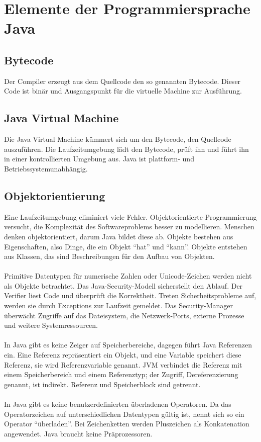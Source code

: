 \section{Elemente der Programmiersprache Java}
\subsection{Bytecode}
Der Compiler erzeugt aus dem Quellcode den so genannten Bytecode. Dieser Code ist binär und Ausgangspunkt für die virtuelle Machine zur Ausführung.
\subsection{Java Virtual Machine}
Die Java Virtual Machine kümmert sich um den Bytecode, den Quellcode auszuführen. Die Laufzeitumgebung lädt den Bytecode, prüft ihn und führt ihn in einer kontrollierten Umgebung aus. Java ist plattform- und Betriebssystemunabhängig.
\subsection{Objektorientierung}
Eine Laufzeitumgebung eliminiert viele Fehler. Objektorientierte Programmierung versucht, die Komplexität des Softwareproblems besser zu modellieren. Menschen denken objektorientiert, darum Java bildet diese ab. Objekte bestehen aus Eigenschaften, also Dinge, die ein Objekt ``hat'' und ``kann''. Objekte entstehen aus Klassen, das sind Beschreibungen für den Aufbau von Objekten.
\\\\
Primitive Datentypen für numerische Zahlen oder Unicode-Zeichen werden nicht als Objekte betrachtet. Das Java-Security-Modell sicherstellt den Ablauf. Der Verifier liest Code und überprüft die Korrektheit. Treten Sicherheitsprobleme auf, werden sie durch Exceptions zur Laufzeit gemeldet. Das Security-Manager überwächt Zugriffe auf das Dateisystem, die Netzwerk-Ports, externe Prozesse und weitere Systemressourcen.
\\\\
In Java gibt es keine Zeiger auf Speicherbereiche, dagegen führt Java Referenzen ein. Eine Referenz repräsentiert ein Objekt, und eine Variable speichert diese Referenz, sie wird Referenzvariable genannt. JVM verbindet die Referenz mit einem Speicherbereich und einem Referenztyp; der Zugriff, Dereferenzierung genannt, ist indirekt. Referenz und Speicherblock sind getrennt.
\\\\
In Java gibt es keine benutzerdefinierten überladenen Operatoren. Da das Operatorzeichen auf unterschiedlichen Datentypen gültig ist, nennt sich so ein Operator ``überladen''. Bei Zeichenketten werden Pluszeichen als Konkatenation angewendet. Java braucht keine Präprozessoren.
